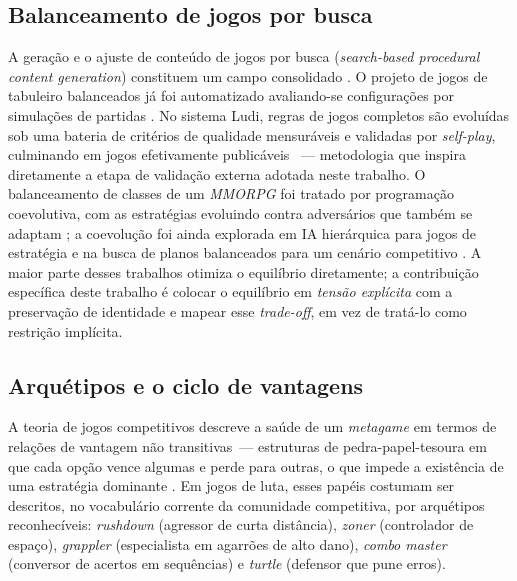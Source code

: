 \documentclass[12pt]{article}
\begin{document}
\subsection{Balanceamento de jogos por busca}

A geração e o ajuste de conteúdo de jogos por busca (\emph{search-based procedural
content generation}) constituem um campo consolidado
\cite{togelius2011searchbased,yannakakis2018ai}. O projeto de jogos de tabuleiro
balanceados já foi automatizado avaliando-se configurações por simulações de
partidas \cite{hom2007automatic}. No sistema Ludi, regras de jogos completos são
evoluídas sob uma bateria de critérios de qualidade mensuráveis e validadas por
\emph{self-play}, culminando em jogos efetivamente publicáveis
\cite{browne2010evolutionary}~--- metodologia que inspira diretamente a etapa de
validação externa adotada neste trabalho. O balanceamento de classes de um
\emph{MMORPG} foi tratado por programação coevolutiva, com as estratégias
evoluindo contra adversários que também se adaptam \cite{chen2014mmorpg}; a
coevolução foi ainda explorada em IA hierárquica para jogos de estratégia
\cite{livingstone2006coevolution} e na busca de planos balanceados para um
cenário competitivo \cite{preuss2012balanced}. A maior parte desses trabalhos otimiza o equilíbrio
diretamente; a contribuição específica deste trabalho é colocar o equilíbrio em
\emph{tensão explícita} com a preservação de identidade e mapear esse
\emph{trade-off}, em vez de tratá-lo como restrição implícita.

\subsection{Arquétipos e o ciclo de vantagens}
\label{sec:arquetipos}

A teoria de jogos competitivos descreve a saúde de um \emph{metagame} em termos de
relações de vantagem não transitivas~--- estruturas de pedra-papel-tesoura em que
cada opção vence algumas e perde para outras, o que impede a existência de uma
estratégia dominante
\cite{gingold2006rps,elias2012characteristics,sirlin2006playing}. Em jogos de
luta, esses papéis costumam ser descritos, no vocabulário corrente da comunidade
competitiva, por arquétipos reconhecíveis: \emph{rushdown} (agressor de curta
distância), \emph{zoner} (controlador de espaço), \emph{grappler} (especialista em
agarrões de alto dano), \emph{combo master} (conversor de acertos em sequências) e
\emph{turtle} (defensor que pune erros).
\end{document}
